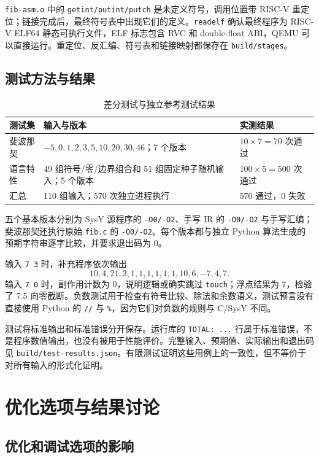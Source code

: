 \documentclass[UTF8,a4paper,10pt]{ctexart}
\begin{document}
\texttt{fib-asm.o} 中的 \texttt{getint/putint/putch} 是未定义符号，调用位置带 RISC-V 重定位；链接完成后，最终符号表中出现它们的定义。\texttt{readelf} 确认最终程序为 RISC-V ELF64 静态可执行文件，ELF 标志包含 RVC 和 double-float ABI，QEMU 可以直接运行。重定位、反汇编、符号表和链接映射都保存在 \texttt{build/stages}。

\subsection{测试方法与结果}

\begin{table}[H]
  \centering
  \caption{差分测试与独立参考测试结果}
  \begin{tabularx}{\textwidth}{p{2.6cm}Yp{3.0cm}}
    \toprule
    测试集 & 输入与版本 & 实测结果 \\
    \midrule
    斐波那契 & $-5,0,1,2,3,5,10,20,30,46$；7 个版本 & $10\times7=70$ 次通过 \\
    语言特性 & 49 组符号/零/边界组合和 51 组固定种子随机输入；5 个版本 & $100\times5=500$ 次通过 \\
    汇总 & 110 组输入；570 次独立进程执行 & 570 通过，0 失败 \\
    \bottomrule
  \end{tabularx}
\end{table}

五个基本版本分别为 SysY 源程序的 \texttt{-O0/-O2}、手写 IR 的 \texttt{-O0/-O2} 与手写汇编；斐波那契还执行原始 \texttt{fib.c} 的 \texttt{-O0/-O2}。每个版本都与独立 Python 算法生成的预期字符串逐字比较，并要求退出码为 0。

输入 \texttt{7 3} 时，补充程序依次输出
\[
10,4,21,2,1,1,1,1,1,1,10,6,-7,4,7.
\]
输入 \texttt{7 0} 时，副作用计数为 0，说明逻辑或确实跳过 \texttt{touch}；浮点结果为 7，检验了 7.5 向零截断。负数测试用于检查有符号比较、除法和余数语义，测试预言没有直接使用 Python 的 \texttt{//} 与 \texttt{\%}，因为它们对负数的规则与 C/SysY 不同。

测试将标准输出和标准错误分开保存。运行库的 \texttt{TOTAL: ...} 行属于标准错误，不是程序数值输出，也没有被用于性能评价。完整输入、预期值、实际输出和退出码见 \texttt{build/test-results.json}。有限测试证明这些用例上的一致性，但不等价于对所有输入的形式化证明。

\section{优化选项与结果讨论}

\subsection{优化和调试选项的影响}
\end{document}
